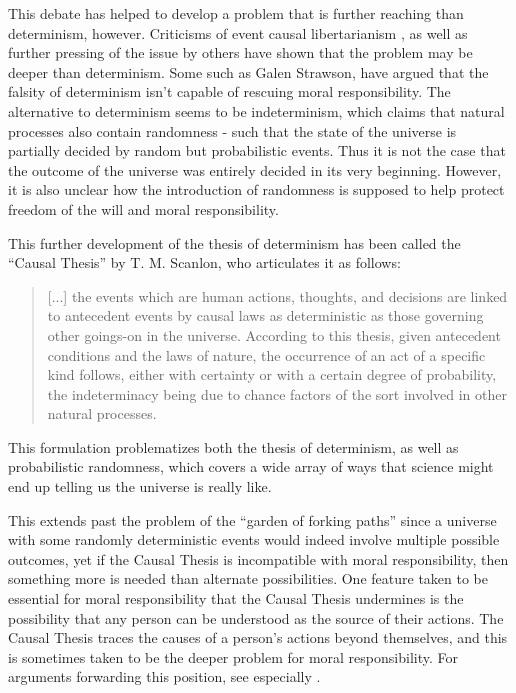 \documentclass[phd,12pt,oneside,paper=letterpaper]{ubcthesis}
\begin{document}
This debate has helped to develop a problem that is further reaching than determinism, however. Criticisms of event causal libertarianism \citep{oconnor2005, clarke1993}, as well as further pressing of the issue by others \citep{pereboom2001, strawsong2010} have shown that the problem may be deeper than determinism. Some such as Galen Strawson, have argued that the falsity of determinism isn't capable of rescuing moral responsibility. The alternative to determinism seems to be indeterminism, which claims that natural processes also contain randomness - such that the state of the universe is partially decided by random but probabilistic events. Thus it is not the case that the outcome of the universe was entirely decided in its very beginning. However, it is also unclear how the introduction of randomness is supposed to help protect freedom of the will and moral responsibility.

This further development of the thesis of determinism has been called the ``Causal Thesis'' by T. M. Scanlon, who articulates it as follows:
\begin{quote}
[...] the events which are human actions, thoughts, and decisions are linked to antecedent events by causal laws as deterministic as those governing other goings-on in the universe. According to this thesis, given antecedent conditions and the laws of nature, the occurrence of an act of a specific kind follows, either with certainty or with a certain degree of probability, the indeterminacy being due to chance factors of the sort involved in other natural processes. \citep[p.152]{scanlon1988} 
\end{quote}

This formulation problematizes both the thesis of determinism, as well as probabilistic randomness, which covers a wide array of ways that science might end up telling us the universe is really like. 

This extends past the problem of the ``garden of forking paths'' since a universe with some randomly deterministic events would indeed involve multiple possible outcomes, yet if the Causal Thesis is incompatible with moral responsibility, then something more is needed than alternate possibilities. One feature taken to be essential for moral responsibility that the Causal Thesis undermines is the possibility that any person can be understood as the source of their actions. The Causal Thesis traces the causes of a person's actions beyond themselves, and this is sometimes taken to be the deeper problem for moral responsibility. For arguments forwarding this position, see especially \citep{strawsong2010, pereboom2001, oconnor2005}.
\end{document}

